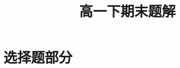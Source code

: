

\title{高一下期末题解}
\author{}


    \maketitle
    \tableofcontents
    \newpage

    \section{选择题部分}

